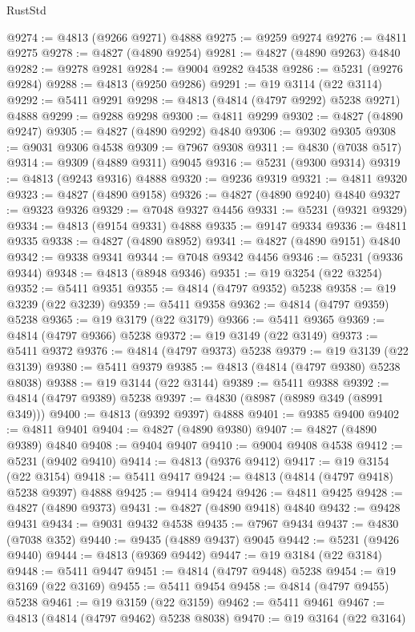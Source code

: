 \begin{lexlean}{RustStd}
\begin{coremodule}
@9274 := @4813 (@9266 @9271) @4888
@9275 := @9259 @9274
@9276 := @4811 @9275
@9278 := @4827 (@4890 @9254)
@9281 := @4827 (@4890 @9263) @4840
@9282 := @9278 @9281
@9284 := @9004 @9282 @4538
@9286 := @5231 (@9276 @9284)
@9288 := @4813 (@9250 @9286)
@9291 := @19 @3114 (@22 @3114)
@9292 := @5411 @9291
@9298 := @4813 (@4814 (@4797 @9292) @5238 @9271) @4888
@9299 := @9288 @9298
@9300 := @4811 @9299
@9302 := @4827 (@4890 @9247)
@9305 := @4827 (@4890 @9292) @4840
@9306 := @9302 @9305
@9308 := @9031 @9306 @4538
@9309 := @7967 @9308
@9311 := @4830 (@7038 @517)
@9314 := @9309 (@4889 @9311) @9045
@9316 := @5231 (@9300 @9314)
@9319 := @4813 (@9243 @9316) @4888
@9320 := @9236 @9319
@9321 := @4811 @9320
@9323 := @4827 (@4890 @9158)
@9326 := @4827 (@4890 @9240) @4840
@9327 := @9323 @9326
@9329 := @7048 @9327 @4456
@9331 := @5231 (@9321 @9329)
@9334 := @4813 (@9154 @9331) @4888
@9335 := @9147 @9334
@9336 := @4811 @9335
@9338 := @4827 (@4890 @8952)
@9341 := @4827 (@4890 @9151) @4840
@9342 := @9338 @9341
@9344 := @7048 @9342 @4456
@9346 := @5231 (@9336 @9344)
@9348 := @4813 (@8948 @9346)
@9351 := @19 @3254 (@22 @3254)
@9352 := @5411 @9351
@9355 := @4814 (@4797 @9352) @5238
@9358 := @19 @3239 (@22 @3239)
@9359 := @5411 @9358
@9362 := @4814 (@4797 @9359) @5238
@9365 := @19 @3179 (@22 @3179)
@9366 := @5411 @9365
@9369 := @4814 (@4797 @9366) @5238
@9372 := @19 @3149 (@22 @3149)
@9373 := @5411 @9372
@9376 := @4814 (@4797 @9373) @5238
@9379 := @19 @3139 (@22 @3139)
@9380 := @5411 @9379
@9385 := @4813 (@4814 (@4797 @9380) @5238 @8038)
@9388 := @19 @3144 (@22 @3144)
@9389 := @5411 @9388
@9392 := @4814 (@4797 @9389) @5238
@9397 := @4830 (@8987 (@8989 @349 (@8991 @349)))
@9400 := @4813 (@9392 @9397) @4888
@9401 := @9385 @9400
@9402 := @4811 @9401
@9404 := @4827 (@4890 @9380)
@9407 := @4827 (@4890 @9389) @4840
@9408 := @9404 @9407
@9410 := @9004 @9408 @4538
@9412 := @5231 (@9402 @9410)
@9414 := @4813 (@9376 @9412)
@9417 := @19 @3154 (@22 @3154)
@9418 := @5411 @9417
@9424 := @4813 (@4814 (@4797 @9418) @5238 @9397) @4888
@9425 := @9414 @9424
@9426 := @4811 @9425
@9428 := @4827 (@4890 @9373)
@9431 := @4827 (@4890 @9418) @4840
@9432 := @9428 @9431
@9434 := @9031 @9432 @4538
@9435 := @7967 @9434
@9437 := @4830 (@7038 @352)
@9440 := @9435 (@4889 @9437) @9045
@9442 := @5231 (@9426 @9440)
@9444 := @4813 (@9369 @9442)
@9447 := @19 @3184 (@22 @3184)
@9448 := @5411 @9447
@9451 := @4814 (@4797 @9448) @5238
@9454 := @19 @3169 (@22 @3169)
@9455 := @5411 @9454
@9458 := @4814 (@4797 @9455) @5238
@9461 := @19 @3159 (@22 @3159)
@9462 := @5411 @9461
@9467 := @4813 (@4814 (@4797 @9462) @5238 @8038)
@9470 := @19 @3164 (@22 @3164)

\end{coremodule}
\end{lexlean}
